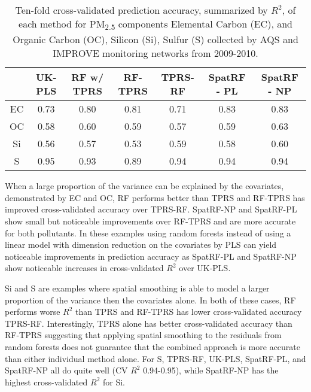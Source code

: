 \documentclass[12pt]{article}
\begin{document}
\begin{table}[]
	\begin{tabular}{|c|c|c|c|c|c|c|}
		\hline
		& UK-PLS & RF w/ TPRS & RF-TPRS & TPRS-RF & SpatRF - PL & SpatRF - NP \\ \hline
		EC & 0.73 & 0.80     & 0.81   & 0.71   & 0.83       & 0.83     \\ \hline
		OC & 0.58  & 0.60      & 0.59   & 0.57   & 0.59      & 0.63       \\ \hline
		Si & 0.56  & 0.57      & 0.53   & 0.59   & 0.58       & 0.60       \\ \hline
		S  & 0.95  & 0.93      & 0.89   & 0.94   & 0.94       & 0.94       \\ \hline
	\end{tabular}
	\caption{Ten-fold cross-validated prediction accuracy, summarized by $R^2$, of each method for PM\textsubscript{2.5} components Elemental Carbon (EC), and Organic Carbon (OC), Silicon (Si), Sulfur (S) collected by AQS and IMPROVE monitoring networks from 2009-2010. }
	\label{cvr2}
\end{table}

When a large proportion of the variance can be explained by the covariates, demonstrated by EC and OC, RF performs better than TPRS and RF-TPRS has improved cross-validated accuracy over TPRS-RF. SpatRF-NP and SpatRF-PL show small but noticeable improvements over RF-TPRS and are more accurate for both pollutants. In these examples using random forests instead of using a linear model with dimension reduction on the covariates by PLS can yield noticeable improvements in prediction accuracy as SpatRF-PL and SpatRF-NP show noticeable increases in cross-validated $R^2$ over UK-PLS. 

Si and S are examples where spatial smoothing is able to model a larger proportion of the variance then the covariates alone. In both of these cases, RF performs worse $R^2$ than TPRS and RF-TPRS has lower cross-validated accuracy TPRS-RF. Interestingly, TPRS alone has better cross-validated accuracy than RF-TPRS suggesting that applying spatial smoothing to the residuals from random forests does not guarantee that the combined approach is more accurate than either individual method alone. For S, TPRS-RF, UK-PLS, SpatRF-PL, and SpatRF-NP all do quite well (CV $R^2$ 0.94-0.95), while SpatRF-NP has the highest cross-validated $R^2$ for Si.  



\end{document}
